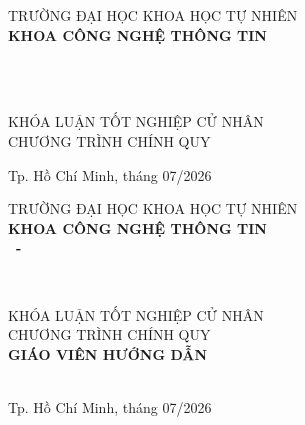 \begin{titlepage}

\begin{center}
TRƯỜNG ĐẠI HỌC KHOA HỌC TỰ NHIÊN\\
\textbf{KHOA CÔNG NGHỆ THÔNG TIN}\\[2cm]


{ \Large \bfseries \tenSV\\[2cm] } 

{ \Large \bfseries  \MakeUppercase{\tenKL}\\[3cm]} 

\large KHÓA LUẬN TỐT NGHIỆP CỬ NHÂN\\
\large CHƯƠNG TRÌNH CHÍNH QUY\\



\vfill
Tp. Hồ Chí Minh, tháng 07/2026

\end{center}

\pagebreak



\begin{center}

TRƯỜNG ĐẠI HỌC KHOA HỌC TỰ NHIÊN\\
\textbf{KHOA CÔNG NGHỆ THÔNG TIN}\\[2cm]


{\large \bfseries \tenSV~-~\mssv} 

{ \Large \bfseries \MakeUppercase{\tenKL}\\[2cm] } 

\large KHÓA LUẬN TỐT NGHIỆP CỬ NHÂN\\
\large CHƯƠNG TRÌNH CHÍNH QUY\\[2cm]

\textbf{GIÁO VIÊN HƯỚNG DẪN}\\
\tenGVHD\\


\vfill
Tp. Hồ Chí Minh, tháng 07/2026

\end{center}

\end{titlepage}
